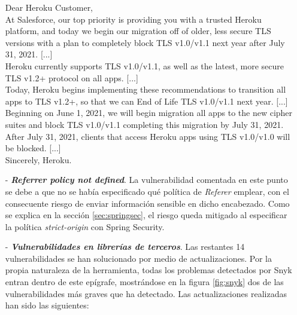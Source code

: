 \documentclass[a4paper]{article}
\begin{document}
\begin{itemize}
		\begin{displayquote}
			Dear Heroku Customer,
			\\
			
			At Salesforce, our top priority is providing you with a trusted Heroku platform, and today we begin our migration off of older, less secure TLS versions with a plan to completely block TLS v1.0/v1.1 next year after July 31, 2021. [...]
			\\
			
			Heroku currently supports TLS v1.0/v1.1, as well as the latest, more secure TLS v1.2+ protocol on all apps. [...]
			\\
			
			Today, Heroku begins implementing these recommendations to transition all apps to TLS v1.2+, so that we can End of Life TLS v1.0/v1.1 next year. [...]
			\\
			
			Beginning on June 1, 2021, we will begin migration all apps to the new cipher suites and block TLS v1.0/v1.1 completing this migration by July 31, 2021. 
			\\
			
			After July 31, 2021, clients that access Heroku apps using TLS v1.0/v1.0 will be blocked. [...]
			\\
			
			Sincerely, Heroku.
		\end{displayquote}
		
		\item[-] \textbf{\emph{Referrer policy not defined}}. La vulnerabilidad comentada en este punto se debe a que no se había especificado qué política de \emph{Referer} emplear, con el consecuente riesgo de enviar información sensible en dicho encabezado. Como se explica en la sección \ref{sec:springsec}, el riesgo queda mitigado al especificar la política \emph{strict-origin} con Spring Security.
		
		\item[-] \textbf{\emph{Vulnerabilidades en librerías de terceros}}. Las restantes 14 vulnerabilidades se han solucionado por medio de actualizaciones. Por la propia naturaleza de la herramienta, todas los problemas detectados por Snyk entran dentro de este epígrafe, mostrándose en la figura \ref{fig:snyk} dos de las vulnerabilidades más graves que ha detectado. Las actualizaciones realizadas han sido las siguientes:
		

\end{itemize}
\end{document}
